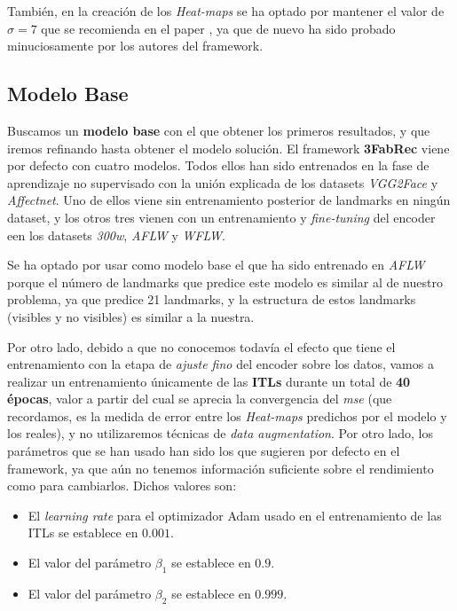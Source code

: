         \medskip

        \noindent También, en la creación de los \textit{Heat-maps} se ha optado por mantener el valor de $\sigma =7$ que se recomienda en el paper \cite{browatzki20203fabrec}, ya que de nuevo ha sido probado minuciosamente por los autores del framework.
    
    \subsection{Modelo Base}
        \noindent Buscamos un \textbf{modelo base} con el que obtener los primeros resultados, y que iremos refinando hasta obtener el modelo solución. El framework \textbf{3FabRec} viene por defecto con cuatro modelos. Todos ellos han sido entrenados en la fase de aprendizaje no supervisado con la unión explicada de los datasets \textit{VGG2Face} y \textit{Affectnet}. Uno de ellos viene sin entrenamiento posterior de landmarks en ningún dataset, y los otros tres vienen con un entrenamiento y \textit{fine-tuning} del encoder een los datasets \textit{300w}, \textit{AFLW} y \textit{WFLW}.

        \medskip

        \noindent Se ha optado por usar como modelo base el que ha sido entrenado en \textit{AFLW} porque el número de landmarks que predice este modelo es similar al de nuestro problema, ya que predice 21 landmarks, y la estructura de estos landmarks (visibles y no visibles) es similar a la nuestra.

        \medskip

        \noindent Por otro lado, debido a que no conocemos todavía el efecto que tiene el entrenamiento con la etapa de \textit{ajuste fino} del encoder sobre los datos, vamos a realizar un entrenamiento únicamente de las \textbf{ITLs} durante un total de \textbf{40 épocas}, valor a partir del cual se aprecia la convergencia del \textit{mse} (que recordamos, es la medida de error entre los \textit{Heat-maps} predichos por el modelo y los reales), y no utilizaremos técnicas de \textit{data augmentation}. Por otro lado, los parámetros que se han usado han sido los que sugieren por defecto en el framework, ya que aún no tenemos información suficiente sobre el rendimiento como para cambiarlos. Dichos valores son: 

        \begin{itemize}
            \item El \textit{learning rate} para el optimizador Adam usado en el entrenamiento de las ITLs se establece en $0.001$. 
            \item El valor del parámetro $\beta_1$ se establece en $0.9$.
            \item El valor del parámetro $\beta_2$ se establece en $0.999$.
        \end{itemize}

